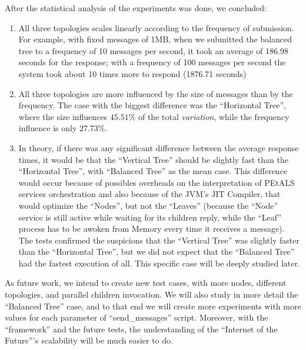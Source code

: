  
After the statistical analysis of the experiments was done, we concluded:
\begin{enumerate}
	\item All three topologies scales linearly according to the frequency of submission. For example, with fixed messages of 1MB, when we submitted the balanced tree to a frequency of 10 messages per second, it took an average of 186.98 seconds for the response; with a frequency of 100 messages per second the system took about 10 times more to respond (1876.71 seconds)
	\item All three topologies are more influenced by the size of messages than by the frequency. The case with the biggest difference was the ``Horizontal Tree'', where the size influences $45.51\%$ of the total \emph{variation}, while the frequency influence is only $27.73\%$.
	\item In theory, if there was any significant difference between the average response times, it would be that the ``Vertical Tree'' should be slightly fast than the ``Horizontal Tree'', with ``Balanced Tree'' as the mean case. This difference would occur because of possibles overheads on the interpretation of PEtALS services orchestration and also because of the JVM's JIT Compiler, that would optimize the ``Nodes'', but not the ``Leaves'' (because the ``Node'' service is still active while waiting for its children reply, while the ``Leaf'' process has to be awoken from Memory every time it receives a message). The tests confirmed the suspicions that the ``Vertical Tree'' was slightly faster than the ``Horizontal Tree'', but we did not expect that the ``Balanced Tree'' had the fastest execution of all. This specific case will be deeply studied later.
\end{enumerate}


As future work, we intend to  create new test cases, with more nodes, different topologies, and parallel children invocation. We will also study in more detail the ``Balanced Tree'' case, and to that end we will create more experiments with more values for each parameter of ``send_messages'' script. Moreover, with the ``framework'' and the future tests, the understanding of the ``Internet of the Future'''s scalability will be much easier to do.